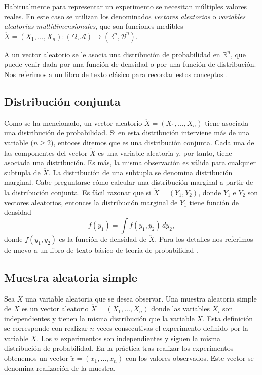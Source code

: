 Habitualmente para representar un experimento se necesitan múltiples valores reales. En este caso se utilizan los denominados \emph{vectores aleatorios} o \emph{variables aleatorias multidimensionales}, que son funciones medibles $\utilde{X} = (X_1, \ldots, X_n): (\Omega, \mathcal{A}) \to (\mathbb{R}^n, \mathcal{B}^n)$.

A un vector aleatorio se le asocia una distribución de probabilidad en $\mathbb{R}^n$, que puede venir dada por una función de densidad o por una función de distribución. Nos referimos a un libro de texto clásico para recordar estos conceptos \cite{loeve}.

\subsection{Distribución conjunta}

Como se ha mencionado, un vector aleatorio $\utilde{X} = (X_1, \ldots, X_n)$ tiene asociada una distribución de probabilidad. Si en esta distribución interviene más de una variable ($n \ge 2$), entoces diremos que es una distribución conjunta. Cada una de las componentes del vector $\utilde{X}$ es una variable aleatoria y, por tanto, tiene asociada una distribución. Es más, la misma observación es válida para cualquier subtupla de $\utilde{X}$. La distribución de una subtupla se denomina distribución marginal. Cabe preguntarse cómo calcular una distribución marginal a partir de la distribución conjunta. Es fácil razonar que si $\utilde{X} = (Y_1, Y_2)$, donde $Y_1$ e $Y_2$ son vectores aleatorios, entonces la distribución marginal de $Y_1$ tiene función de densidad
\[f(y_1) = \int f(y_1, y_2) \, dy_2,\]
donde $f(y_1, y_2)$ es la función de densidad de $\utilde{X}$. Para los detalles nos referimos de nuevo a un libro de texto básico de teoría de probabilidad \cite{loeve}.

\subsection{Muestra aleatoria simple}

Sea $X$ una variable aleatoria que se desea observar. Una muestra aleatoria simple de $X$ es un vector aleatorio $\utilde{X} = (X_1, \ldots, X_n)$ donde las variables $X_i$ son independientes y tienen la misma distribución que la variable $X$. Esta definición se corresponde con realizar $n$ veces consecutivas el experimento definido por la variable $X$. Los $n$ experimentos son independientes y siguen la misma distribución de probabilidad. En la práctica tras realizar los experimentos obtenemos un vector  $\utilde{x} = (x_1, \ldots, x_n)$ con los valores observados. Este vector se denomina realización de la muestra.

